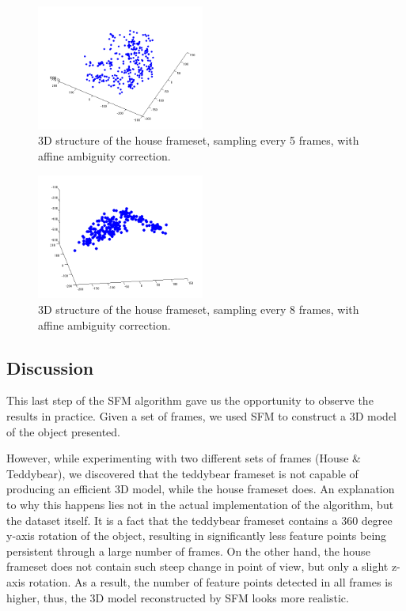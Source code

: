 \begin{figure}[ht!]
  \centering
    \includegraphics[width=0.49\textwidth]{figures/icp5-8.png}
    \caption{3D structure of the house frameset, sampling every 5 frames, with affine ambiguity correction.}
    \label{fig:icp5-8}
\end{figure}

\begin{figure}[ht!]
  \centering
    \includegraphics[width=0.49\textwidth]{figures/icp8-5.png}
    \caption{3D structure of the house frameset, sampling every 8 frames, with affine ambiguity correction.}
    \label{fig:icp8-5}
\end{figure}



\subsection{Discussion}
This last step of the SFM algorithm gave us the opportunity to observe the results in practice. Given a set of frames, we used SFM to construct a 3D model of the object presented. 

However, while experimenting with two different sets of frames (House \& Teddybear), we discovered that the teddybear frameset is not capable of producing an efficient 3D model, while the house frameset does. An explanation to why this happens lies not in the actual implementation of the algorithm, but the dataset itself. It is a fact that the teddybear frameset contains a 360 degree y-axis rotation of the object, resulting in significantly less feature points being persistent through a large number of frames. 
On the other hand, the house frameset does not contain such steep change in point of view, but only a slight z-axis rotation. As a result, the number of feature points detected in all frames is higher, thus, the 3D model reconstructed by SFM looks more realistic.

